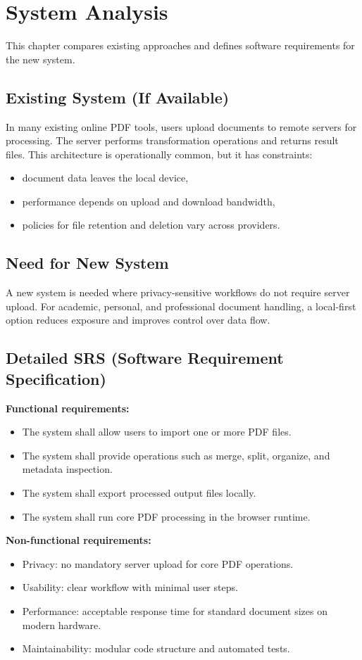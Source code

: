 \section{System Analysis}
This chapter compares existing approaches and defines software requirements for the new system.

\subsection{Existing System (If Available)}
In many existing online PDF tools, users upload documents to remote servers for processing. The server performs transformation operations and returns result files. This architecture is operationally common, but it has constraints:
\begin{itemize}
  \item document data leaves the local device,
  \item performance depends on upload and download bandwidth,
  \item policies for file retention and deletion vary across providers.
\end{itemize}

\subsection{Need for New System}
A new system is needed where privacy-sensitive workflows do not require server upload. For academic, personal, and professional document handling, a local-first option reduces exposure and improves control over data flow.

\subsection{Detailed SRS (Software Requirement Specification)}
\textbf{Functional requirements:}
\begin{itemize}
  \item The system shall allow users to import one or more PDF files.
  \item The system shall provide operations such as merge, split, organize, and metadata inspection.
  \item The system shall export processed output files locally.
  \item The system shall run core PDF processing in the browser runtime.
\end{itemize}

\textbf{Non-functional requirements:}
\begin{itemize}
  \item Privacy: no mandatory server upload for core PDF operations.
  \item Usability: clear workflow with minimal user steps.
  \item Performance: acceptable response time for standard document sizes on modern hardware.
  \item Maintainability: modular code structure and automated tests.
\end{itemize}
